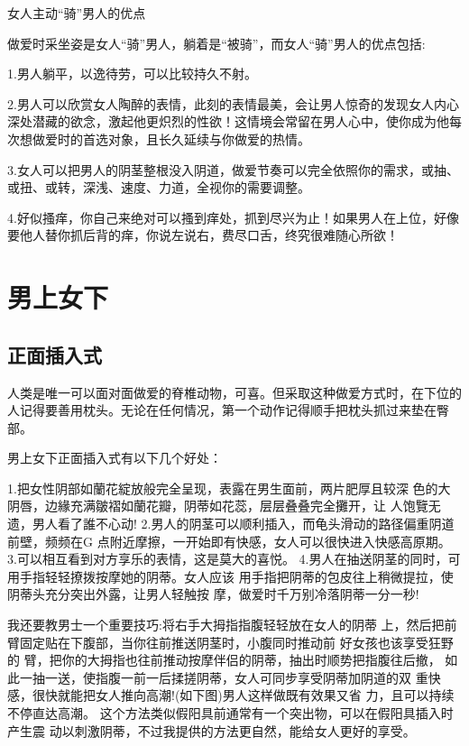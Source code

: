 \documentclass[12pt,UTF8]{ctexbook}
\begin{document}
女人主动“骑”男人的优点

做爱时采坐姿是女人“骑”男人，躺着是“被骑”，而女人“骑”男人的优点包括:

1.男人躺平，以逸待劳，可以比较持久不射。

2.男人可以欣赏女人陶醉的表情，此刻的表情最美，会让男人惊奇的发现女人内心深处潜藏的欲念，激起他更炽烈的性欲！这情境会常留在男人心中，使你成为他每次想做爱时的首选对象，且长久延续与你做爱的热情。

3.女人可以把男人的阴茎整根没入阴道，做爱节奏可以完全依照你的需求，或抽、或扭、或转，深浅、速度、力道，全视你的需要调整。

4.好似搔痒，你自己来绝对可以搔到痒处，抓到尽兴为止！如果男人在上位，好像要他人替你抓后背的痒，你说左说右，费尽口舌，终究很难随心所欲！

\section{男上女下}

\subsection{正面插入式}

人类是唯一可以面对面做爱的脊椎动物，可喜。但采取这种做爱方式时，在下位的人记得要善用枕头。无论在任何情况，第一个动作记得顺手把枕头抓过来垫在臀部。

男上女下正面插入式有以下几个好处：

1.把女性阴部如蘭花綻放般完全呈现，表露在男生面前，两片肥厚且较深
色的大阴唇，边緣充满皺褶如蘭花瓣，阴蒂如花蕊，层层叠叠完全攤开，让
人饱覽无遗，男人看了誰不心动!
2.男人的阴茎可以顺利插入，而龟头滑动的路径偏重阴道前壁，频频在G
点附近摩擦，一开始即有快感，女人可以很快进入快感高原期。
3.可以相互看到对方享乐的表情，这是莫大的喜悦。
4.男人在抽送阴茎的同时，可用手指轻轻撩拨按摩她的阴蒂。女人应该
用手指把阴蒂的包皮往上稍微提拉，使阴蒂头充分突出外露，让男人轻触按
摩，做爱时千万别冷落阴蒂一分一秒!

我还要教男士一个重要技巧:将右手大拇指指腹轻轻放在女人的阴蒂
上，然后把前臂固定贴在下腹部，当你往前推送阴茎时，小腹同时推动前
好女孩也该享受狂野的
臂，把你的大拇指也往前推动按摩伴侣的阴蒂，抽出时顺势把指腹往后撤，
如此一抽一送，使指腹一前一后揉搓阴蒂，女人可同步享受阴蒂加阴道的双
重快感，很快就能把女人推向高潮!(如下图)男人这样做既有效果又省
力，且可以持续不停直达高潮。
这个方法类似假阳具前通常有一个突出物，可以在假阳具插入时产生震
动以刺激阴蒂，不过我提供的方法更自然，能给女人更好的享受。
\end{document}
